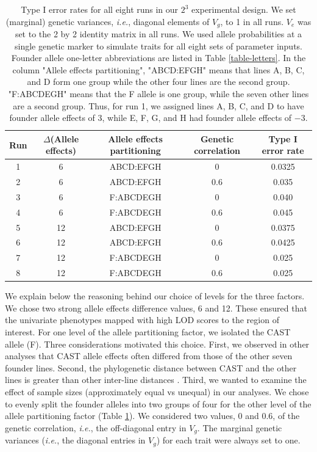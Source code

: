 \documentclass[12pt,twoside, lineno]{gsajnl}
\begin{document}
\begin{center}
\begin{table}
\small
  \begin{tabular}{ c | c | c | c | c}
    \hline
    Run & $\Delta$(Allele effects) & Allele effects partitioning & Genetic correlation & Type I error rate \\ \hline
    1 & 6 & ABCD:EFGH & 0 & 0.0325\\
    2 & 6 & ABCD:EFGH & 0.6 & 0.035\\
    3 & 6 & F:ABCDEGH & 0 & 0.040\\
    4 & 6 & F:ABCDEGH & 0.6 & 0.045\\
    5 & 12 & ABCD:EFGH & 0 & 0.0375\\
    6 & 12 & ABCD:EFGH & 0.6 & 0.0425\\
    7 & 12 & F:ABCDEGH & 0 & 0.025\\
    8 & 12 & F:ABCDEGH & 0.6 & 0.025\\
    \hline
  \end{tabular}
  \caption{Type I error rates for all eight runs in our $2^3$ experimental design. We set (marginal) genetic variances, \emph{i.e.}, diagonal elements of $V_g$, to 1 in all runs. $V_e$ was set to the 2 by 2 identity matrix in all runs. We used allele probabilities at a single genetic marker to simulate traits for all eight sets of parameter inputs. Founder allele one-letter abbreviations are listed in Table \ref{table-letters}. In the column "Allele effects partitioning", "ABCD:EFGH" means that lines A, B, C, and D form one group while the other four lines are the second group. "F:ABCDEGH" means that the F allele is one group, while the seven other lines are a second group. Thus, for run 1, we assigned lines A, B, C, and D to have founder allele effects of $3$, while E, F, G, and H had founder allele effects of $-3$.}
  \label{table-typeI}
  \end{table}
\end{center}

We explain below the reasoning behind our choice of levels for the three factors. We chose two strong allele effects difference values, 6 and 12. These ensured that the univariate phenotypes mapped with high LOD scores to the region of interest. For one level of the allele partitioning factor, we isolated the CAST allele (F). Three considerations motivated this choice. First, we observed in other analyses that CAST allele effects often differed from those of the other seven founder lines. Second, the phylogenetic distance between CAST and the other lines is greater than other inter-line distances \citep{didion2013deconstructing}. Third, we wanted to examine the effect of sample sizes (approximately equal vs unequal) in our analyses.  We chose to evenly split the founder alleles into two groups of four for the other level of the allele partitioning factor (Table \ref{table-typeI}). We considered two values, 0 and 0.6, of the genetic correlation, \textit{i.e.}, the off-diagonal entry in $V_g$. The marginal genetic variances (\textit{i.e.}, the diagonal entries in $V_g$) for each trait were always set to one.
\end{document}

